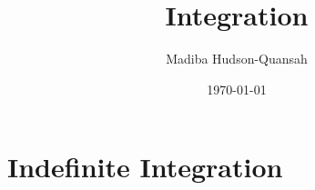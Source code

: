 \documentclass[12pt letter]{report}
\title{\Huge{Integration}}
\author{\huge{Madiba Hudson-Quansah}}
\date{\today}
\begin{document}
\maketitle
\newpage
{}
\tableofcontents
\pagebreak

\chapter{Indefinite Integration}
\end{document}
